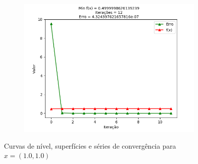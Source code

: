 \documentclass[a4paper, 12pt]{article}
\begin{document}
\begin{figure}[H]
\begin{subfigure}{0.3\textwidth}
  \includegraphics[width=\linewidth]{1/D/x1x1/convergencia.png}
\end{subfigure}
\caption{Curvas de nível, superfícies e séries de convergência para $x = (1.0, 1.0)$}
\label{fig:x1x1}
\end{figure}
\end{document}
